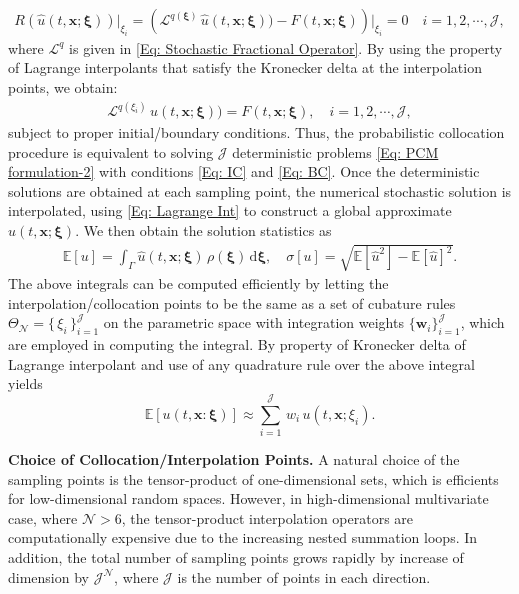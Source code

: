 %
\begin{align}
\label{Eq: PCM formulation}
%
R \left( \hat{u}(t,\textbf{x};\boldsymbol{\xi}) \right) \Big|_{\xi_i} 
= 
\left(
\mathcal{L}^{q(\boldsymbol{\xi})} \, \hat{u}(t,\textbf{x};\boldsymbol{\xi})) - F(t,\textbf{x};\boldsymbol{\xi}) 
\right)\Big|_{\xi_i}  = 0 \quad i =1,2,\cdots,\mathcal{J},
%
\end{align}
%
where $\mathcal{L}^{q}$ is given in \eqref{Eq: Stochastic Fractional Operator}. By using the property of Lagrange interpolants that satisfy the Kronecker delta at the interpolation points, we obtain:
%
\begin{align}
\label{Eq: PCM formulation-2}
%
\mathcal{L}^{q(\xi_i)} \, u(t,\textbf{x};\boldsymbol{\xi})) 
= F(t,\textbf{x};\boldsymbol{\xi}),
\quad i =1,2,\cdots,\mathcal{J},
%
\end{align}
%
subject to proper initial/boundary conditions. Thus, the probabilistic collocation procedure is equivalent to solving $\mathcal{J}$ deterministic problems \eqref{Eq: PCM formulation-2} with conditions \eqref{Eq: IC} and \eqref{Eq: BC}. Once the deterministic solutions are obtained at each sampling point, the numerical stochastic solution is interpolated, using \eqref{Eq: Lagrange Int}  to construct a global approximate $\hat{u} (t,\textbf{x}; \boldsymbol \xi)$. We then obtain the solution statistics as  
%
\begin{align}
\label{Eq: Expectation STD}
%
\mathbb{E}[u] = \int_{\Gamma} \hat{u} (t,\textbf{x}; \boldsymbol \xi) \, \rho(\boldsymbol \xi)  \, \mathrm d \boldsymbol \xi ,
\quad
\sigma[u] =\sqrt{\mathbb{E}[ \hat{u}^2 ] -   \mathbb{E}[\hat{u}]^2 }.
%
\end{align}
% 
The above integrals can be computed efficiently by letting the interpolation/collocation points to be the same as a set of cubature rules $\Theta_\mathcal{N} = \big\{ \, \xi_i \, \big\}_{i=1}^{\mathcal{J}}$ on the parametric space with integration weights $\{\mathbf{w}_i\}_{i=1}^{\mathcal{J}}$, which are employed in computing the integral. By property of Kronecker delta of Lagrange interpolant and use of any quadrature rule over the above integral yields 
%
\begin{equation}
\label{Eq: Exp Approx}
\mathbb{E}[u(t,\textbf{x}:\boldsymbol{\xi})] 
\approx 
\sum_{i=1}^{\mathcal{J}} \, w_i \,u(t,\textbf{x};\xi_i).  
\end{equation}
% 



\vspace{0.1 in}
\textbf{Choice of Collocation/Interpolation Points.}
%
A natural choice of the sampling points is the tensor-product of one-dimensional sets, which is efficients for low-dimensional random spaces. However, in high-dimensional multivariate case, where $\mathcal{N} > 6$, the tensor-product interpolation operators are computationally expensive due to the increasing nested summation loops. In addition, the total number of sampling points grows rapidly by increase of dimension by $\mathcal{J}^\mathcal{N}$, where $\mathcal{J}$ is the number of points in each direction.

